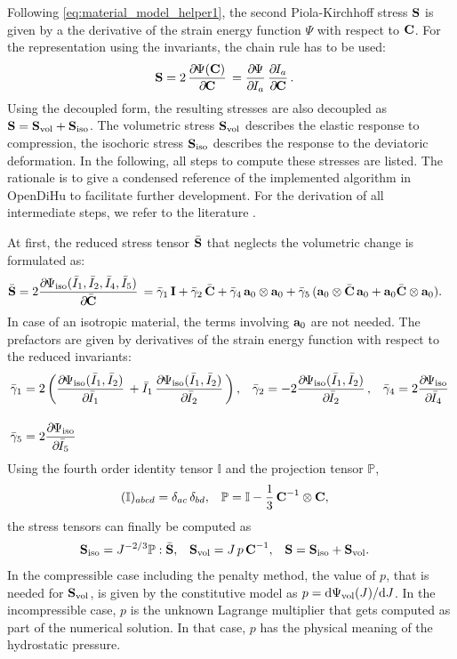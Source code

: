 Following \cref{eq:material_model_helper1}, the second Piola-Kirchhoff stress $\textbf{S}$ is given by a the derivative of the strain energy function $\Psi$ with respect to $\textbf{C}$.
For the representation using the invariants, the chain rule has to be used:%
\begin{align*}
   \bfS &= 2\,\p{\Psi(\bfC)}{\bfC} = \p{\Psi}{I_a}\p{I_a}{\bfC}.
\end{align*}
Using the decoupled form, the resulting stresses are also decoupled as $\textbf{S} = \textbf{S}_\text{vol}+\textbf{S}_\text{iso}$. The volumetric stress $\textbf{S}_\text{vol}$ describes the elastic response to compression, the isochoric stress $\textbf{S}_\text{iso}$ describes the response to the deviatoric deformation. In the following, all steps to compute these stresses are listed. The rationale is to give a condensed reference of the implemented algorithm in OpenDiHu to facilitate further development.
For the derivation of all intermediate steps, we refer to the literature \cite{holzapfel2000nonlinear}.

At first, the reduced stress tensor $\bar{\textbf{S}}$ that neglects the volumetric change is formulated as:%
%
\begin{align*}
  \bar{\bfS} = 2\p{\Psi_\text{iso}(\bar{I}_1,\bar{I}_2,\bar{I}_4,\bar{I}_5)}{\bar{\bfC}} &= \bar{\gamma}_1\,\bfI + \bar{\gamma}_2\,\bar{\bfC}
  + \bar{\gamma}_4\, \bfa_0 \otimes \bfa_0 + \bar{\gamma}_5\,(\bfa_0 \otimes \bar{\bfC}\,\bfa_0 + \bfa_0\bar{\bfC}\otimes \bfa_0).
\end{align*}
In case of an isotropic material, the terms involving $\textbf{a}_0$ are not needed. The prefactors are given by derivatives of the strain energy function with respect to the reduced invariants:
%
\begin{align*}
  \bar{\gamma}_1 &= 2\left(\p{\Psi_\text{iso}(\bar{I}_1, \bar{I}_2)}{\bar{I}_1} + \bar{I}_1\,\p{\Psi_\text{iso}(\bar{I}_1, \bar{I}_2)}{\bar{I}_2}\right),
  &\bar{\gamma}_2 &= -2\p{\Psi_\text{iso}(\bar{I}_1, \bar{I}_2)}{\bar{I}_2},
  &\bar{\gamma}_4 &= 2\p{\Psi_\text{iso}}{\bar{I}_4}\\[4mm]
  \bar{\gamma}_5 &= 2\p{\Psi_\text{iso}}{\bar{I}_5}
\end{align*}
%
Using the fourth order identity tensor $\mathbb{I}$ and the projection tensor $\mathbb{P}$,%
\begin{align*}
  (\mathbb{I})_{abcd} &= \delta_{ac}\,\delta_{bd}, &
  \mathbb{P} &= \mathbb{I} - \displaystyle\frac{\displaystyle{1}}{\displaystyle{3}}\, \textbf{C}^{-1} \otimes \textbf{C},
\end{align*}
the stress tensors can finally be computed as
\begin{align*}
  \textbf{S}_\text{iso} &= J^{-2/3}\mathbb{P}:\bar{\textbf{S}}, &
  \textbf{S}_\text{vol} &= J\,p\,\textbf{C}^{-1}, &
  \textbf{S} &= \textbf{S}_\text{iso} + \textbf{S}_\text{vol}.
\end{align*}
In the compressible case including the penalty method, the value of $p$, that is needed for $\textbf{S}_\text{vol}$, is given by the constitutive model as $p = \d \Psi_\text{vol}(J)/\d J$. In the incompressible case, $p$ is the unknown Lagrange multiplier that gets computed as part of the numerical solution. In that case, $p$ has the physical meaning of the hydrostatic pressure.

